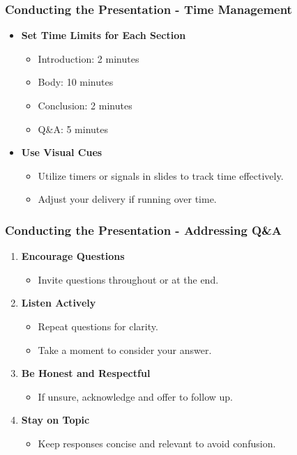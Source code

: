 \documentclass{beamer}
\begin{document}
\begin{frame}[fragile]
    \frametitle{Conducting the Presentation - Time Management}
    \begin{itemize}
        \item \textbf{Set Time Limits for Each Section}
            \begin{itemize}
                \item Introduction: 2 minutes 
                \item Body: 10 minutes
                \item Conclusion: 2 minutes 
                \item Q\&A: 5 minutes
            \end{itemize}
        \item \textbf{Use Visual Cues}
            \begin{itemize}
                \item Utilize timers or signals in slides to track time effectively.
                \item Adjust your delivery if running over time.
            \end{itemize}
    \end{itemize}
\end{frame}

\begin{frame}[fragile]
    \frametitle{Conducting the Presentation - Addressing Q\&A}
    \begin{enumerate}
        \item \textbf{Encourage Questions} 
            \begin{itemize}
                \item Invite questions throughout or at the end.
            \end{itemize}
        \item \textbf{Listen Actively}
            \begin{itemize}
                \item Repeat questions for clarity.
                \item Take a moment to consider your answer.
            \end{itemize}
        \item \textbf{Be Honest and Respectful}
            \begin{itemize}
                \item If unsure, acknowledge and offer to follow up.
            \end{itemize}
        \item \textbf{Stay on Topic}
            \begin{itemize}
                \item Keep responses concise and relevant to avoid confusion.
            \end{itemize}
    \end{enumerate}
\end{frame}
\end{document}
